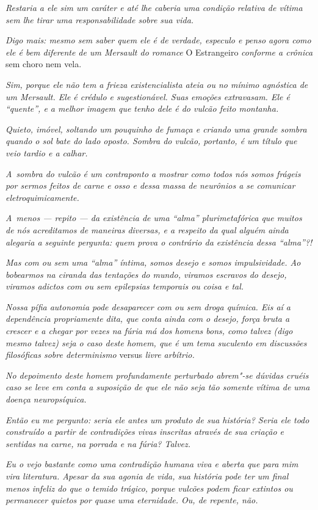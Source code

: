 \emph{Restaria a ele sim um caráter e até lhe caberia uma condição
relativa de vítima sem lhe tirar uma responsabilidade sobre sua vida.}

\emph{Digo mais: mesmo sem saber quem ele é de verdade, especulo e penso
agora como ele é bem diferente de um Mersault do romance} O Estrangeiro \emph{conforme a crônica} sem choro nem vela.

\emph{Sim, porque ele não tem a frieza existencialista ateia ou no
mínimo agnóstica de um Mersault. Ele é crédulo e sugestionável. Suas
emoções extravasam. Ele é ``quente'', e a melhor imagem que tenho dele é
do vulcão feito montanha.}

\emph{Quieto, imóvel, soltando um pouquinho de fumaça e criando uma
grande sombra quando o sol bate do lado oposto. Sombra do vulcão,
portanto, é um título que veio tardio e a calhar.}

\emph{A~sombra do vulcão é um contraponto a mostrar como todos nós somos
frágeis por sermos feitos de carne e osso e dessa massa de neurônios a
se comunicar eletroquimicamente.}

\emph{A~menos --- repito --- da existência de uma ``alma''
plurimetafórica que muitos de nós acreditamos de maneiras diversas, e a
respeito da qual alguém ainda alegaria a seguinte pergunta: quem prova o
contrário da existência dessa ``alma''?!}

\emph{Mas com ou sem uma ``alma'' íntima, somos desejo e somos
impulsividade. Ao bobearmos na ciranda das tentações do mundo, viramos
escravos do desejo, viramos adictos com ou sem epilepsias temporais ou
coisa e tal.}

\emph{Nossa pífia autonomia pode desaparecer com ou sem droga química.
Eis aí a dependência propriamente dita, que conta ainda com o desejo,
força bruta a crescer e a chegar por vezes na fúria má dos homens bons,
como talvez (digo mesmo talvez) seja o caso deste homem, que é um tema
suculento em discussões filosóficas sobre determinismo} versus \emph{livre
arbítrio.}

\emph{No depoimento deste homem profundamente perturbado abrem"-se
dúvidas cruéis caso se leve em conta a suposição de que ele não seja tão
somente vítima de uma doença neuropsíquica.}~

\emph{Então eu me pergunto: seria ele antes um produto de sua história?
Seria ele todo construído a partir de contradições vivas inscritas
através de sua criação e sentidas na carne, na porrada e na fúria?
Talvez.}

\emph{Eu o vejo bastante como uma contradição humana viva e aberta que
para mim vira literatura. Apesar da sua agonia de vida, sua história
pode ter um final menos infeliz do que o temido trágico, porque vulcões
podem ficar extintos ou permanecer quietos por quase uma eternidade. Ou,
de repente, não.}
\endgroup